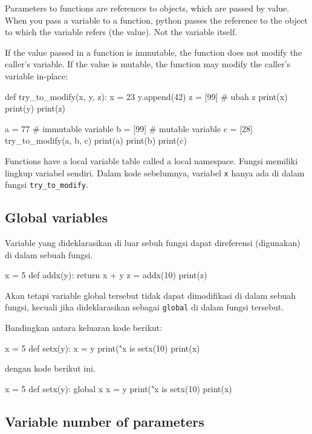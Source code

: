 Parameters to functions are references to objects, which are passed by value.
When you pass a variable to a function, python passes the reference to the object
to which the variable refers (the value). Not the variable itself.

If the value passed in a function is immutable, the function does not modify the
caller’s variable. If the value is mutable, the function may modify the caller's
variable in-place:

\begin{pythoncode}
def try_to_modify(x, y, z):
    x = 23
    y.append(42)
    z = [99] # ubah z
    print(x)
    print(y)
    print(z)

a = 77    # immutable variable
b = [99]  # mutable variable
c = [28]
try_to_modify(a, b, c)
print(a)
print(b)
print(c)
\end{pythoncode}

Functions have a local variable table called a local namespace.
Fungsi memiliki lingkup variabel sendiri. Dalam kode sebelumnya,
variabel \texttt{x} hanya ada di dalam fungsi \texttt{try\_to\_modify}.


\subsection{Global variables}

Variable yang dideklarasikan di luar sebuh fungsi dapat direferensi (digunakan)
di dalam sebuah fungsi.

\begin{pythoncode}
x = 5
def addx(y):
    return x + y
z = addx(10)
print(z)
\end{pythoncode}

Akan tetapi variable global tersebut tidak dapat dimodifikasi di dalam sebuah
fungsi, kecuali jika dideklarasikan sebagai \texttt{global} di dalam fungsi
tersebut.

Bandingkan antara keluaran kode berikut:
\begin{pythoncode}
x = 5
def setx(y):
    x = y
    print("x is %
setx(10)
print(x)
\end{pythoncode}
%
dengan kode berikut ini.
%
\begin{pythoncode}
x = 5
def setx(y):
    global x
    x = y
    print("x is %
setx(10)
print(x)
\end{pythoncode}


\subsection{Variable number of parameters}

